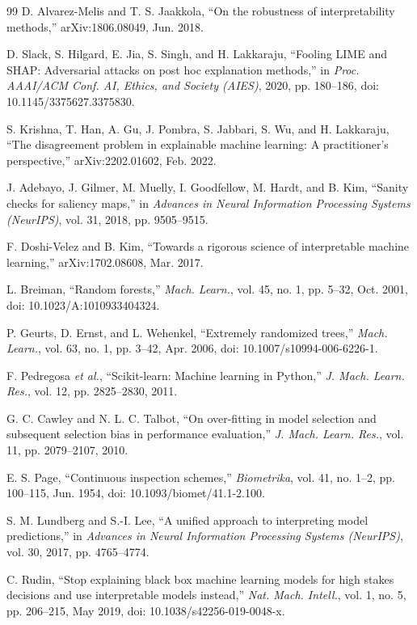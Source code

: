 \documentclass[11pt,a4paper]{article}
\begin{document}
\begin{thebibliography}{99}
 D. Alvarez-Melis and T. S. Jaakkola, ``On the robustness of interpretability methods,'' arXiv:1806.08049, Jun. 2018.

 D. Slack, S. Hilgard, E. Jia, S. Singh, and H. Lakkaraju, ``Fooling LIME and SHAP: Adversarial attacks on post hoc explanation methods,'' in \emph{Proc. AAAI/ACM Conf. AI, Ethics, and Society (AIES)}, 2020, pp. 180--186, doi: 10.1145/3375627.3375830.

 S. Krishna, T. Han, A. Gu, J. Pombra, S. Jabbari, S. Wu, and H. Lakkaraju, ``The disagreement problem in explainable machine learning: A practitioner's perspective,'' arXiv:2202.01602, Feb. 2022.

 J. Adebayo, J. Gilmer, M. Muelly, I. Goodfellow, M. Hardt, and B. Kim, ``Sanity checks for saliency maps,'' in \emph{Advances in Neural Information Processing Systems (NeurIPS)}, vol. 31, 2018, pp. 9505--9515.

 F. Doshi-Velez and B. Kim, ``Towards a rigorous science of interpretable machine learning,'' arXiv:1702.08608, Mar. 2017.

 L. Breiman, ``Random forests,'' \emph{Mach. Learn.}, vol. 45, no. 1, pp. 5--32, Oct. 2001, doi: 10.1023/A:1010933404324.

 P. Geurts, D. Ernst, and L. Wehenkel, ``Extremely randomized trees,'' \emph{Mach. Learn.}, vol. 63, no. 1, pp. 3--42, Apr. 2006, doi: 10.1007/s10994-006-6226-1.

 F. Pedregosa \emph{et al.}, ``Scikit-learn: Machine learning in Python,'' \emph{J. Mach. Learn. Res.}, vol. 12, pp. 2825--2830, 2011.

 G. C. Cawley and N. L. C. Talbot, ``On over-fitting in model selection and subsequent selection bias in performance evaluation,'' \emph{J. Mach. Learn. Res.}, vol. 11, pp. 2079--2107, 2010.

 E. S. Page, ``Continuous inspection schemes,'' \emph{Biometrika}, vol. 41, no. 1--2, pp. 100--115, Jun. 1954, doi: 10.1093/biomet/41.1-2.100.

 S. M. Lundberg and S.-I. Lee, ``A unified approach to interpreting model predictions,'' in \emph{Advances in Neural Information Processing Systems (NeurIPS)}, vol. 30, 2017, pp. 4765--4774.

 C. Rudin, ``Stop explaining black box machine learning models for high stakes decisions and use interpretable models instead,'' \emph{Nat. Mach. Intell.}, vol. 1, no. 5, pp. 206--215, May 2019, doi: 10.1038/s42256-019-0048-x.


\end{thebibliography}
\end{document}
